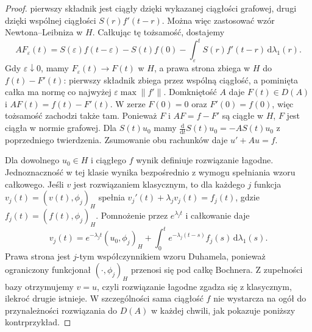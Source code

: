 \begin{proof}
pierwszy składnik jest ciągły dzięki wykazanej ciągłości
grafowej, drugi dzięki wspólnej ciągłości $S(r)f'(t-r)$.
Można więc zastosować wzór Newtona--Leibniza w $H$.
Całkując tę tożsamość, dostajemy
\[
 AF_\varepsilon(t)=S(\varepsilon)f(t-\varepsilon)
 -S(t)f(0)-\int_\varepsilon^t S(r)f'(t-r)\,
 \mathrm d\lambda_1(r).
\]
Gdy $\varepsilon\downarrow0$, mamy
$F_\varepsilon(t)\to F(t)$ w $H$, a prawa strona
zbiega w $H$ do $f(t)-F'(t)$: pierwszy składnik
zbiega przez wspólną ciągłość, a pominięta całka
ma normę co najwyżej $\varepsilon\max\|f'\|$.
Domkniętość $A$ daje $F(t)\in D(A)$ i
$AF(t)=f(t)-F'(t)$. W zerze $F(0)=0$ oraz
$F'(0)=f(0)$, więc tożsamość zachodzi także tam.
Ponieważ $F$ i $AF=f-F'$ są ciągłe w $H$,
$F$ jest ciągła w normie grafowej.
Dla $S(t)u_0$ mamy $\frac{\mathrm d}{\mathrm dt}S(t)u_0
=-AS(t)u_0$ z poprzedniego twierdzenia.
Zsumowanie obu rachunków daje $u'+Au=f$.

Dla dowolnego $u_0\in H$ i ciągłego $f$ wynik definiuje
rozwiązanie łagodne. Jednoznaczność w tej klasie wynika
bezpośrednio z wymogu spełniania wzoru całkowego.
Jeśli $v$ jest rozwiązaniem klasycznym, to
dla każdego $j$ funkcja $v_j(t)=(v(t),\phi_j)_H$
spełnia $v_j'(t)+\lambda_j v_j(t)=f_j(t)$, gdzie
$f_j(t)=(f(t),\phi_j)_H$. Pomnożenie przez
$e^{\lambda_jt}$ i całkowanie daje
\[
 v_j(t)=e^{-\lambda_jt}(u_0,\phi_j)_H+
 \int_0^t e^{-\lambda_j(t-s)} f_j(s)\,
 \mathrm d\lambda_1(s).
\]
Prawa strona jest $j$-tym współczynnikiem wzoru Duhamela,
ponieważ ograniczony funkcjonał $(\cdot,\phi_j)_H$
przenosi się pod całkę Bochnera. Z zupełności bazy
otrzymujemy $v=u$, czyli rozwiązanie łagodne zgadza się
z klasycznym, ilekroć drugie istnieje. W szczególności
sama ciągłość $f$ nie wystarcza na ogół do
przynależności rozwiązania do $D(A)$ w każdej chwili,
jak pokazuje poniższy kontrprzykład.
\end{proof}

